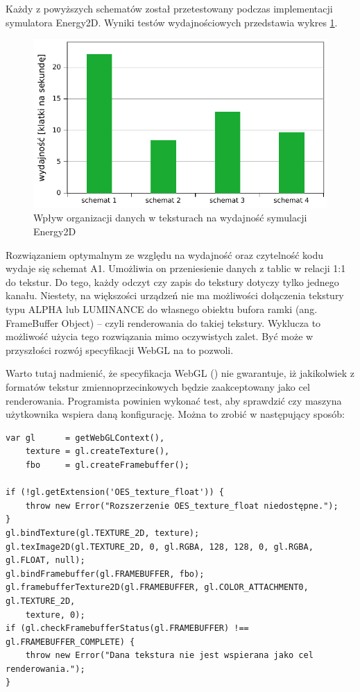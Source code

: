 Każdy z powyższych schematów został przetestowany podczas implementacji
symulatora Energy2D. Wyniki testów wydajnościowych przedstawia wykres
\ref{fig:texPerf}.

\begin{figure}[hbp]
\centering
\includegraphics[width=.9\textwidth]{img/texPerf}
\caption{Wpływ organizacji danych w teksturach na wydajność symulacji Energy2D}
\label{fig:texPerf}
\end{figure}

Rozwiązaniem optymalnym ze względu na wydajność oraz czytelność kodu wydaje się
schemat A1. Umożliwia on przeniesienie danych z tablic w relacji 1:1 do tekstur.
Do tego, każdy odczyt czy zapis do tekstury dotyczy tylko jednego kanału.
Niestety, na większości urządzeń nie ma możliwości dołączenia tekstury typu
ALPHA lub LUMINANCE do własnego obiektu bufora ramki (ang. FrameBuffer Object)
-- czyli renderowania do takiej tekstury. Wyklucza to możliwość użycia tego
rozwiązania mimo oczywistych zalet. Być może w przyszłości rozwój specyfikacji
WebGL na to pozwoli.

Warto tutaj nadmienić, że specyfikacja WebGL (\cite{WebGLSpec}) nie gwarantuje,
iż jakikolwiek z formatów tekstur zmiennoprzecinkowych będzie zaakceptowany jako
cel renderowania. Programista powinien wykonać test, aby sprawdzić czy maszyna
użytkownika wspiera daną konfigurację. Można to zrobić w następujący sposób:

\begin{lstlisting}[caption=Weryfikacja poprawności formatu i typu tekstury
używanej jako cel renderowania]
var gl 		= getWebGLContext(),
	texture = gl.createTexture(),
	fbo 	= gl.createFramebuffer();

if (!gl.getExtension('OES_texture_float')) {
	throw new Error("Rozszerzenie OES_texture_float niedostępne.");
}
gl.bindTexture(gl.TEXTURE_2D, texture);
gl.texImage2D(gl.TEXTURE_2D, 0, gl.RGBA, 128, 128, 0, gl.RGBA, gl.FLOAT, null);
gl.bindFramebuffer(gl.FRAMEBUFFER, fbo);
gl.framebufferTexture2D(gl.FRAMEBUFFER, gl.COLOR_ATTACHMENT0, gl.TEXTURE_2D, 
	texture, 0);
if (gl.checkFramebufferStatus(gl.FRAMEBUFFER) !== gl.FRAMEBUFFER_COMPLETE) {
	throw new Error("Dana tekstura nie jest wspierana jako cel renderowania.");
}
\end{lstlisting}

